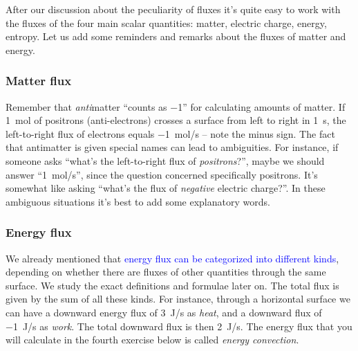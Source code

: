 \documentclass[a4paper,12pt,%
onecolumn,oneside,%
british%
]{memoir}
\renewcommand*{\|}[1][]{\nonscript\:#1\vert\nonscript\:\mathopen{}}
\newcommand*{\sect}{\S}%
\renewcommand*{\autoref}[2]{\sidepar{\vspace{-1ex}\footnotesize{\color{blue}\faIcon{%
angle-right%
}\enspace\sect~\ref{#1} page~\pageref{#1}}}\textcolor{blue}{#2}}
\begin{document}
\bigskip

After our discussion about the peculiarity of fluxes it's quite easy to work with the fluxes of the four main scalar quantities: matter, electric charge, energy, entropy. Let us add some reminders and remarks about the fluxes of matter and energy.


\subsubsection{Matter flux}
\label{sec:matter_flux}

Remember that \emph{anti}matter \enquote{counts as \num{-1}} for calculating amounts of matter. If \qty{1}{mol} of positrons (anti-electrons) crosses a surface from left to right in \qty{1}{s}, the left-to-right flux of electrons equals \qty{-1}{mol/s} -- note the minus sign. The fact that antimatter is given special names can lead to ambiguities. For instance, if someone asks \enquote{what's the left-to-right flux of \emph{positrons}?}, maybe we should answer \enquote{\qty{1}{mol/s}}, since the question concerned specifically positrons. It's somewhat like asking \enquote{what's the flux of \emph{negative} electric charge?}. In these ambiguous situations it's best to add some explanatory words.

\subsubsection{Energy flux}
\label{sec:energy_flux}
We already mentioned that \autoref{sec:forms_energy}{energy flux can be categorized into different kinds}, depending on whether there are fluxes of other quantities through the same surface. We study the exact definitions and formulae later on. The total flux is given by the sum of all these kinds. For instance, through a horizontal surface we can have a downward energy flux of \qty{3}{J/s} as \emph{heat}, and a downward flux of \qty{-1}{J/s} as \emph{work}. The total downward flux is then \qty{2}{J/s}. The energy flux that you will calculate in the fourth exercise below is called \emph{energy convection}.
\end{document}
